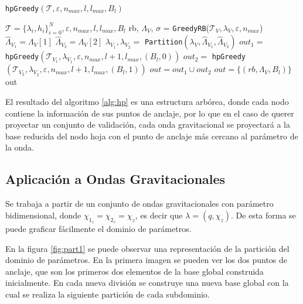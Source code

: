 
\begin{algorithm}
\caption{\texttt{hpGreedy}\((\mathcal{T}, \varepsilon, n_{max}, l, l_{max}, B_{l})\)}\label{alg:hp}
\begin{algorithmic}[1]
\Require $\mathcal{T} = \{ \lambda_{i}, h_{i} \}_{i=0}^N, \varepsilon, n_{max},l, l_{max}, B_{l}$ 
\vspace{3mm}
\State rb, $\Lambda_V$, $\sigma$ = \texttt{GreedyRB}($\mathcal{T}_V,\lambda_V, \varepsilon, n_{max}$) 
\vspace{3mm}
	\State $\hat{\Lambda}_{V_1} = \Lambda_V[1]$
	\State $\hat{\Lambda}_{V_2} = \Lambda_V[2]$
	\State $\lambda_{V_1}, \lambda_{V_2} =$ \texttt{Partition}$(\lambda_V,\hat{\Lambda}_{V_1}, \hat{\Lambda}_{V_2})$
	\State $out_1 = $ \texttt{hpGreedy}\((\mathcal{T}_{V_1}, \lambda_{V_1}, \varepsilon, n_{max}, l+1, l_{max}, (B_{l}, 0))\)
	\State $out_2 = $ \texttt{hpGreedy}\((\mathcal{T}_{V_2} ,\lambda_{V_2}, \varepsilon, n_{max}, l+1, l_{max}, (B_{l}, 1))\)
	\State $out = out_1 \cup out_2$
\Else
	\State $out = \{( rb, \Lambda_V, B_l)\}$
\EndIf
\vspace{3mm}
\Ensure out
\end{algorithmic}
\end{algorithm}

El resultado del algoritmo \ref{alg:hp} es una estructura arbórea, donde cada nodo contiene la información de sus puntos de anclaje, por lo que en el caso de querer proyectar un conjunto de validación, cada onda gravitacional se proyectará a la base reducida del nodo hoja con el punto de anclaje más cercano al parámetro de la onda.


\subsection{Aplicación a Ondas Gravitacionales}

Se trabaja a partir de un conjunto de ondas gravitacionales con parámetro bidimensional, donde $\chi_{1_z} = \chi_{2_z} = \chi_z$, es decir que $\lambda = (q, \chi_z)$. De esta forma se puede graficar fácilmente el dominio de parámetros.



En la figura \ref{fig:part1} se puede observar una representación de la partición del dominio de parámetros. En la primera imagen se pueden ver los dos puntos de anclaje, que son los primeros dos elementos de la base global construida inicialmente. En cada nueva división se construye una nueva base global con la cual se realiza la siguiente partición de cada subdominio.


